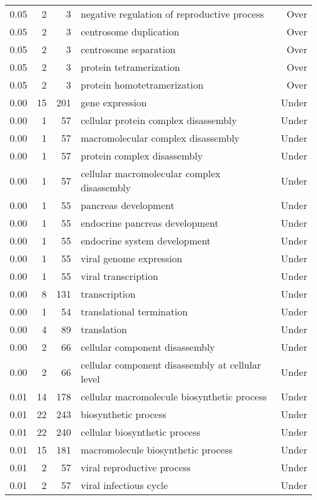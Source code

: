 \documentclass[10pt]{bmc_article}
\newenvironment{bmcformat}{\begin{raggedright}\baselineskip20pt\sloppy\setboolean{publ}{false}}{\end{raggedright}\baselineskip20pt\sloppy}
\begin{document}
\begin{bmcformat}
\begin{longtable}{rrrp{7cm}r}
  0.05 &   2 &   3 & negative regulation of reproductive process & Over \\ 
  0.05 &   2 &   3 & centrosome duplication & Over \\ 
  0.05 &   2 &   3 & centrosome separation & Over \\ 
  0.05 &   2 &   3 & protein tetramerization & Over \\ 
  0.05 &   2 &   3 & protein homotetramerization & Over \\ 
  0.00 &  15 & 201 & gene expression & Under \\ 
  0.00 &   1 &  57 & cellular protein complex disassembly & Under \\ 
  0.00 &   1 &  57 & macromolecular complex disassembly & Under \\ 
  0.00 &   1 &  57 & protein complex disassembly & Under \\ 
  0.00 &   1 &  57 & cellular macromolecular complex disassembly & Under \\ 
  0.00 &   1 &  55 & pancreas development & Under \\ 
  0.00 &   1 &  55 & endocrine pancreas development & Under \\ 
  0.00 &   1 &  55 & endocrine system development & Under \\ 
  0.00 &   1 &  55 & viral genome expression & Under \\ 
  0.00 &   1 &  55 & viral transcription & Under \\ 
  0.00 &   8 & 131 & transcription & Under \\ 
  0.00 &   1 &  54 & translational termination & Under \\ 
  0.00 &   4 &  89 & translation & Under \\ 
  0.00 &   2 &  66 & cellular component disassembly & Under \\ 
  0.00 &   2 &  66 & cellular component disassembly at cellular level & Under \\ 
  0.01 &  14 & 178 & cellular macromolecule biosynthetic process & Under \\ 
  0.01 &  22 & 243 & biosynthetic process & Under \\ 
  0.01 &  22 & 240 & cellular biosynthetic process & Under \\ 
  0.01 &  15 & 181 & macromolecule biosynthetic process & Under \\ 
  0.01 &   2 &  57 & viral reproductive process & Under \\ 
  0.01 &   2 &  57 & viral infectious cycle & Under \\ 

\end{longtable}
\end{bmcformat}
\end{document}
